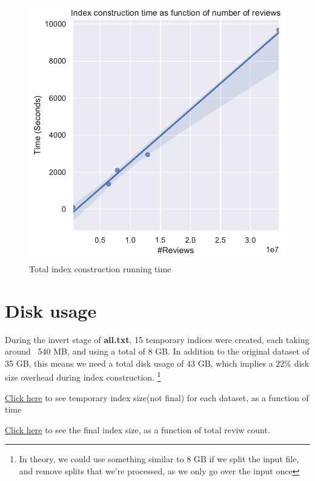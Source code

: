 \documentclass[11pt]{article}
\begin{document}
\begin{figure}[!htb]
	\caption{Total index construction running time}
	\label{fig:totalruntime}
	\centering
	\includegraphics[width=\textwidth,height=\textheight,keepaspectratio]{runtime2.pdf}
\end{figure}




\section{Disk usage}

During the invert stage of \textbf{all.txt}, 15 temporary indices were created, each taking around ~540 MB, and using a total of 8 GB. In addition
to the original dataset of 35 GB, this means we need a total disk usage of 43 GB, which implies a $22\%$ disk size overhead during index construction.
\footnote{In theory, we could use something similar to 8 GB if we split the input file, and remove splits that we're processed, as we only go over the input once}

\hyperref[fig:cumsize]{Click here} to see temporary index size(not final) for each dataset, as a function of time

\hyperref[fig:finalsize]{Click here} to see the final index size, as a function of total reviw count.
\end{document}
